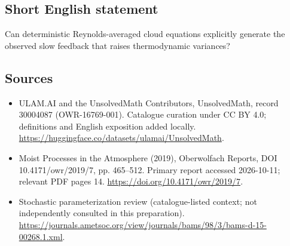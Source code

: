 \documentclass[11pt]{article}
\begin{document}
\subsection{Short English statement}
Can deterministic Reynolds-averaged cloud equations explicitly generate the observed slow feedback that raises thermodynamic variances?
\subsection{Sources}
\begin{itemize}
\item[\hypertarget{source:30004087:1}{S1}] ULAM.AI and the UnsolvedMath Contributors, UnsolvedMath, record 30004087 (OWR-16769-001). Catalogue curation under CC BY 4.0; definitions and English exposition added locally.
\url{https://huggingface.co/datasets/ulamai/UnsolvedMath}.
\item[\hypertarget{source:30004087:2}{S2}] Moist Processes in the Atmosphere (2019), Oberwolfach Reports, DOI 10.4171/owr/2019/7, pp. 465--512. Primary report accessed 2026-10-11; relevant PDF pages 14.
\url{https://doi.org/10.4171/owr/2019/7}.
\item[\hypertarget{source:30004087:3}{S3}] Stochastic parameterization review (catalogue-listed context; not independently consulted in this preparation).
\url{https://journals.ametsoc.org/view/journals/bams/98/3/bams-d-15-00268.1.xml}.
\end{itemize}
\label{end:30004087}
\end{document}
